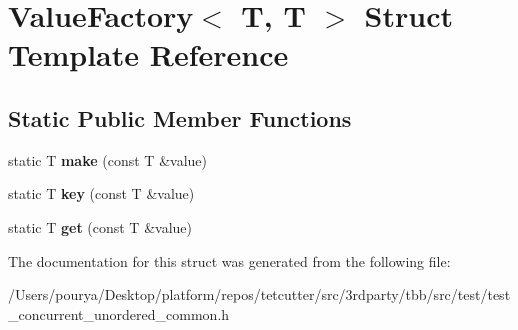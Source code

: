 \hypertarget{structValueFactory_3_01T_00_01T_01_4}{}\section{Value\+Factory$<$ T, T $>$ Struct Template Reference}
\label{structValueFactory_3_01T_00_01T_01_4}
\subsection*{Static Public Member Functions}
\begin{DoxyCompactItemize}
\item 
\hypertarget{structValueFactory_3_01T_00_01T_01_4_aa39b670e9e2337f3e535b29800261736}{}static T {\bfseries make} (const T \&value)\label{structValueFactory_3_01T_00_01T_01_4_aa39b670e9e2337f3e535b29800261736}

\item 
\hypertarget{structValueFactory_3_01T_00_01T_01_4_a51289c4c2cdcd645510bcdfcec2bf304}{}static T {\bfseries key} (const T \&value)\label{structValueFactory_3_01T_00_01T_01_4_a51289c4c2cdcd645510bcdfcec2bf304}

\item 
\hypertarget{structValueFactory_3_01T_00_01T_01_4_af5ae2b3dcccf5dd392796181e9f4d328}{}static T {\bfseries get} (const T \&value)\label{structValueFactory_3_01T_00_01T_01_4_af5ae2b3dcccf5dd392796181e9f4d328}

\end{DoxyCompactItemize}


The documentation for this struct was generated from the following file\+:\begin{DoxyCompactItemize}
\item 
/\+Users/pourya/\+Desktop/platform/repos/tetcutter/src/3rdparty/tbb/src/test/test\+\_\+concurrent\+\_\+unordered\+\_\+common.\+h\end{DoxyCompactItemize}
